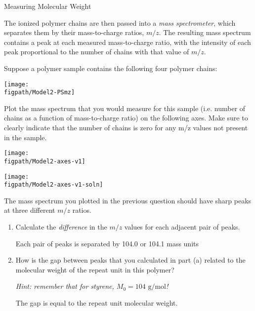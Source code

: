 \begin{activity}{Measuring Molecular Weight}
\begin{model}
	The ionized polymer chains are then passed into a \emph{mass spectrometer}, which separates them by their mass-to-charge ratios, $m/z$.  The resulting mass spectrum contains a peak at each measured mass-to-charge ratio, with the intensity of each peak proportional to the number of chains with that value of $m/z$. 

\end{model}

\begin{ctqs}

	\question Suppose a polymer sample contains the following four polymer chains: \label{\labelbase:ctq:PS-MALDI}
	
			\centerline{\texttt{[image: \\figpath/Model2-PSmz]}}
	
		Plot the mass spectrum that you would measure for this sample (i.e. number of chains as a function of mass-to-charge ratio) on the following axes.  Make sure to clearly indicate that the number of chains is zero for any m/z values not present in the sample.
		
			\begin{solution}[2in]{\centerline{\texttt{[image: \\figpath/Model2-axes-v1]}}}
				\centerline{\texttt{[image: \\figpath/Model2-axes-v1-soln]}}
			\end{solution}
			
	\question The mass spectrum you plotted in the previous question should have sharp peaks at three different $m/z$ ratios.
	
		\begin{enumerate}
			\item Calculate the \emph{difference} in the $m/z$ values for each adjacent pair of peaks.
			
				\begin{solution}[0.75in]{}
					Each pair of peaks is separated by 104.0 or 104.1 mass units
				\end{solution}
			
			\item How is the gap between peaks that you calculated in part (a) related to the molecular weight of the repeat unit in this polymer?
			
				\emph{Hint: remember that for styrene, $M_0 = 104\text{ g/mol}$!}
			
				\begin{solution}[0.75in]{}
					The gap is equal to the repeat unit molecular weight.
				\end{solution}
			

\end{enumerate}
\end{ctqs}
\end{activity}
